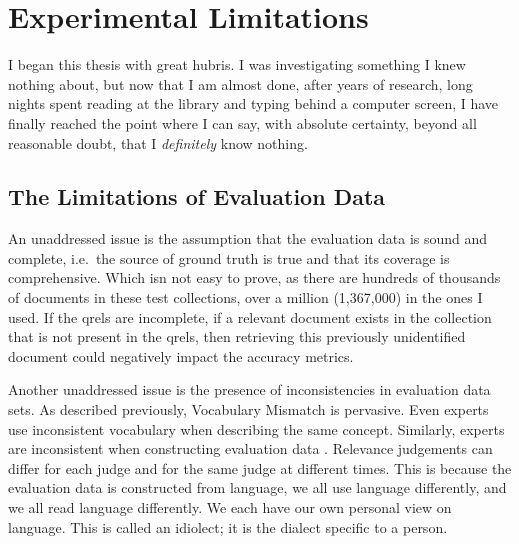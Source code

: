 \chapter{Experimental Limitations}





I began this thesis with great hubris. I was investigating something I knew nothing about, but now that I am almost done, after years of research, long nights spent reading at the library and typing behind a computer screen, I have finally reached the point where I can say, with absolute certainty, beyond all reasonable doubt, that I \textit{definitely} know nothing.

\section{The Limitations of Evaluation Data}
An unaddressed issue is the assumption that the evaluation data is sound and complete, i.e.\ the source of ground truth is true and that its coverage is comprehensive. Which isn not easy to prove, as there are hundreds of thousands of documents in these test collections, over a million (1,367,000) in the ones I used. If the qrels are incomplete, if a relevant document exists in the collection that is not present in the qrels, then retrieving this previously unidentified document could negatively impact the accuracy metrics.

Another unaddressed issue is the presence of inconsistencies in evaluation data sets. As described previously, Vocabulary Mismatch is pervasive. Even experts use inconsistent vocabulary when describing the same concept. Similarly, experts are inconsistent when constructing evaluation data \cite{schamber1994relevance}. Relevance judgements can differ for each judge and for the same judge at different times. This is because the evaluation data is constructed from language, we all use language differently, and we all read language differently. We each have our own personal view on language. This is called an idiolect; it is the dialect specific to a person.

